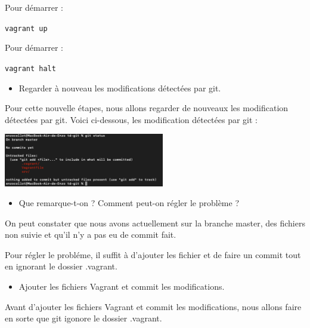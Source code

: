 \documentclass[12pt]{article}
\begin{document}
Pour démarrer : 

\texttt{vagrant up}

Pour démarrer : 

\texttt{vagrant halt}

\vspace{0.3cm}

\newpage

\begin{itemize}
  \item Regarder à nouveau les modifications détectées par git.
\end{itemize}

Pour cette nouvelle étapes, nous allons regarder de nouveaux les modification détectées par git. Voici ci-dessous, les modification détectées par git : 

\vspace{0.3cm}

\begin{center}
  \includegraphics[width=7cm]{Image-TD-Git-1/git-status-2.png}
\end{center}

\vspace{0.3cm}

\begin{itemize}
  \item Que remarque-t-on ? Comment peut-on régler le problème ?
\end{itemize}

On peut constater que nous avons actuellement sur la branche master, des fichiers non suivie et qu'il n'y a pas eu de commit fait. \newline

Pour régler le probléme, il suffit à d'ajouter les fichier et de faire un commit tout en ignorant le dossier .vagrant.

\vspace{0.3cm}

\begin{itemize}
  \item Ajouter les fichiers Vagrant et commit les modifications.
\end{itemize}

Avant d'ajouter les fichiers Vagrant et commit les modifications, nous allons faire en sorte que git igonore le dossier .vagrant. \newline
\end{document}
